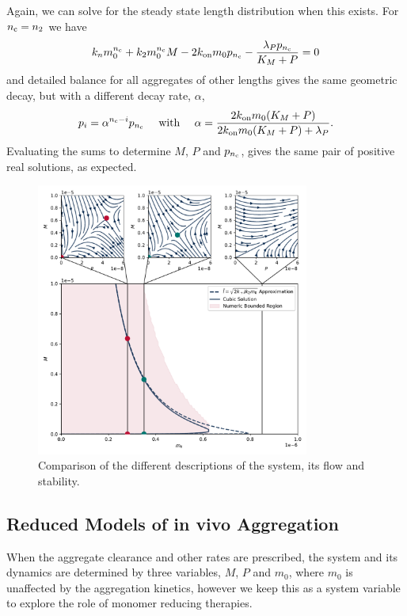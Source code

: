 Again, we can solve for the steady state length distribution when this exists. For $n_{\mathrm{c}}=n_2$ we have
\begin{equation}
    k_n m_0^{n_{\mathrm{c}}} + k_2 m_0^{n_{\mathrm{c}}} M - 2 k_\text{on} m_0 p_{n_{\mathrm{c}}} - \frac{\lambda_P p_{n_{\mathrm{c}}}}{K_M + P} = 0
\end{equation}
and detailed balance for all aggregates of other lengths gives the same geometric decay, but with a different decay rate, $\alpha$,
\begin{equation}
    p_i = \alpha^{n_{\mathrm{c}}-i} p_{n_{\mathrm{c}}}\quad\text{ with }\quad\alpha=\frac{2k_\text{on} m_0 (K_M + P)}{2k_\text{on} m_0 (K_M + P) + \lambda_P}.
\end{equation}
Evaluating the sums to determine $M$, $P$ and $p_{n_{\mathrm{c}}}$, gives the same pair of positive real solutions, as expected.

\begin{figure}
    \centering
    \includegraphics[width=0.8\textwidth]{figures/confusingNumericRegion.pdf}
    \caption{Comparison of the different descriptions of the system, its flow and stability.}
    \label{fig:4-steadyMM}
\end{figure}

\subsection{Reduced Models of in vivo Aggregation}

When the aggregate clearance and other rates are prescribed, the system and its dynamics are determined by three variables, $M$, $P$ and $m_0$, where $m_0$ is unaffected by the aggregation kinetics, however we keep this as a system variable to explore the role of monomer reducing therapies.

